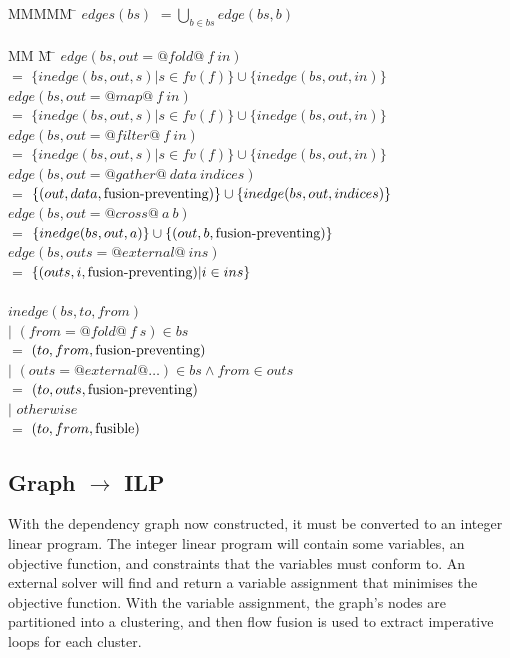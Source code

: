 \begin{tabbing}
MMMMM       \= \kill
$edges(bs)$ \> $= \bigcup_{b \in bs}edge(bs, b)$    \\
\\
MM             \= M \= \kill
$edge(bs, out = @fold@~f~in)$ \\
    \> $=$    \> $\{inedge(bs,out,s) | s \in fv(f)\} \cup \{inedge(bs, out, in) \}$       \\
$edge(bs, out = @map@~f~in)$  \\
    \> $=$    \> $\{inedge(bs,out,s) | s \in fv(f)\} \cup \{inedge(bs, out, in) \}$       \\
$edge(bs, out = @filter@~f~in)$  \\
    \> $=$    \> $\{inedge(bs,out,s) | s \in fv(f)\} \cup \{inedge(bs, out, in) \}$       \\
$edge(bs, out = @gather@~data~indices)$  \\
    \> $=$    \> $\{(out,data, \mbox{fusion-preventing}) \} \cup \{inedge(bs, out, indices) \}$       \\
$edge(bs, out = @cross@~a~b)$            \\
    \> $=$    \> $\{inedge(bs, out, a) \}           \cup      \{(out, b, \mbox{fusion-preventing}) \}$ \\
$edge(bs, outs = @external@~ins)$  \\
    \> $=$    \> $\{(outs,i, \mbox{fusion-preventing}) | i \in ins \}$ \\
\\
$inedge(bs,to,from)$ \\
    \> $|$ \> $(from = @fold@~f~s) \in bs$     \\
    \> $=$ \> $(to, from, \mbox{fusion-preventing})$  \\
    \> $|$ \> $(outs = @external@ \ldots) \in bs     \wedge from \in outs$     \\
    \> $=$ \> $(to, outs, \mbox{fusion-preventing})$  \\
    \> $|$ \> $otherwise$                      \\
    \> $=$ \> $(to, from, \mathrm{fusible})$            \\
\end{tabbing}


\subsection{Graph $\to$ ILP}
With the dependency graph now constructed, it must be converted to an integer linear program. The integer linear program will contain some variables, an objective function, and constraints that the variables must conform to. An external solver will find and return a variable assignment that minimises the objective function. With the variable assignment, the graph's nodes are partitioned into a clustering, and then flow fusion\cite{lippmeier2013flow} is used to extract imperative loops for each cluster.

